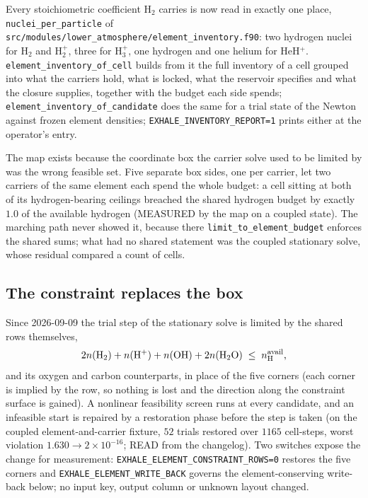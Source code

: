 \documentclass[english,a4paper]{my_memo}
\begin{document}
Every stoichiometric coefficient H$_2$ carries is now read in exactly one
place, \texttt{nuclei\_per\_particle} of
\texttt{src/modules/lower\_atmosphere/element\_inventory.f90}: two hydrogen
nuclei for H$_2$ and H$_2^+$, three for H$_3^+$, one hydrogen and one helium
for HeH$^+$. \texttt{element\_inventory\_of\_cell} builds from it the full
inventory of a cell grouped into what the carriers hold, what is locked, what
the reservoir specifies and what the closure supplies, together with the
budget each side spends; \texttt{element\_inventory\_of\_candidate} does the
same for a trial state of the Newton against frozen element densities;
\texttt{EXHALE\_INVENTORY\_REPORT=1} prints either at the operator's entry.

The map exists because the coordinate box the carrier solve used to be
limited by was the wrong feasible set. Five separate box sides, one per
carrier, let two carriers of the same element each spend the whole budget: a
cell sitting at both of its hydrogen-bearing ceilings breached the shared
hydrogen budget by exactly $1.0$ of the available hydrogen (MEASURED by the
map on a coupled state). The marching path never showed it, because there
\texttt{limit\_to\_element\_budget} enforces the shared sums; what had no
shared statement was the coupled stationary solve, whose residual compared a
count of cells.

\subsection{The constraint replaces the box}

Since 2026-09-09 the trial step of the stationary solve is limited by the
shared rows themselves,
\[
   2n({\rm H_2}) + n({\rm H^+}) + n({\rm OH}) + 2n({\rm H_2O})
   \;\le\; n_{\rm H}^{\rm avail},
\]
and its oxygen and carbon counterparts, in place of the five corners (each
corner is implied by the row, so nothing is lost and the direction along the
constraint surface is gained). A nonlinear feasibility screen runs at every
candidate, and an infeasible start is repaired by a restoration phase before
the step is taken (on the coupled element-and-carrier fixture, $52$ trials
restored over $1165$ cell-steps, worst violation $1.630 \rightarrow
2\times10^{-16}$; READ from the changelog).
Two switches expose the change for measurement:
\texttt{EXHALE\_ELEMENT\_CONSTRAINT\_ROWS=0} restores the five corners and
\texttt{EXHALE\_ELEMENT\_WRITE\_BACK} governs the element-conserving
write-back below; no input key, output column or unknown layout changed.
\end{document}
